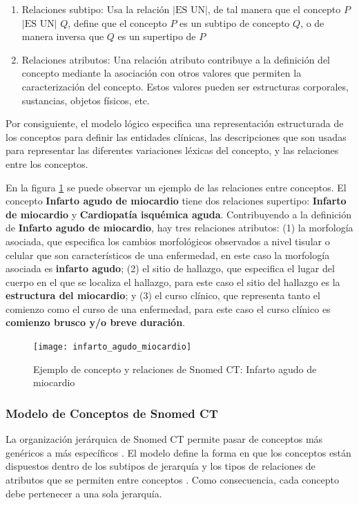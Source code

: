 \begin{enumerate}
\item Relaciones subtipo: Usa la relación $|\text{ES UN}|$, de tal manera que el concepto $P$ $|\text{ES UN}|$ $Q$,  define que el concepto $P$ es un subtipo de concepto $Q$, o de manera inversa que $Q$ es un supertipo de $P$
\item Relaciones atributos: Una relación atributo contribuye a la definición del concepto mediante la asociación con otros valores que permiten la caracterización del concepto. Estos valores pueden ser estructuras corporales, sustancias, objetos físicos, etc.
\end{enumerate}

Por consiguiente, el modelo lógico especifica una representación estructurada de los conceptos para definir las entidades clínicas, las descripciones  que son usadas para representar las diferentes variaciones léxicas del concepto, y las relaciones entre los conceptos.\cite{ihtsdo2016SG}

En la figura \ref{fig:IAM} se puede observar un ejemplo de las relaciones entre conceptos. El concepto \textbf{Infarto agudo de miocardio} tiene dos relaciones supertipo:\textbf{ Infarto de miocardio} y \textbf{Cardiopatía isquémica aguda}. Contribuyendo a la definición de \textbf{Infarto agudo de miocardio}, hay tres relaciones atributos: (1) la morfología asociada, que especifica los cambios morfológicos observados a nivel tisular o celular que
son característicos de una enfermedad, en este caso la morfología asociada es \textbf{infarto agudo}; (2) el sitio de hallazgo, que especifica el lugar del cuerpo en el que se localiza el hallazgo, para este caso el sitio del hallazgo es la \textbf{estructura del miocardio}; y (3) el curso clínico, que representa tanto el comienzo como el curso de una enfermedad, para este caso el curso clínico es \textbf{comienzo brusco y/o breve duración}.

\begin{figure}
\caption{Ejemplo de concepto y relaciones de Snomed CT: Infarto agudo de miocardio}
\label{fig:IAM}
\centering
\texttt{[image: infarto\_agudo\_miocardio]}
\end{figure}


\subsubsection{Modelo de Conceptos de Snomed CT}
La organización jerárquica de Snomed CT permite pasar de conceptos más genéricos a más específicos \cite{Bhattacharyya2016}. El modelo define la forma en que los conceptos están dispuestos dentro de los subtipos de jerarquía y los tipos de relaciones de atributos que se permiten entre conceptos \cite{Bhattacharyya2016,ihtsdo2016SG}. Como consecuencia, cada concepto debe pertenecer a una sola jerarquía.
% 
% 
 
